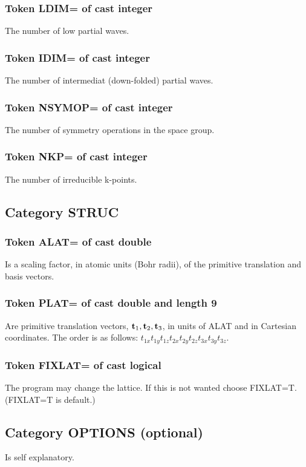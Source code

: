 \documentclass[aps,twocolumn,a4]{revtex4}
\begin{document}
\subsubsection{Token LDIM= of cast integer}
The number of low partial waves.

\subsubsection{Token IDIM= of cast integer}
The number of intermediat (down-folded) partial waves.

\subsubsection{Token NSYMOP= of cast integer}
The number of symmetry operations in the space group.

\subsubsection{Token NKP= of cast integer}
The number of irreducible k-points.

\subsection{Category STRUC}

\subsubsection{Token ALAT= of cast double}
Is a scaling factor, in atomic units (Bohr radii), of the primitive
translation and basis vectors.

\subsubsection{Token PLAT= of cast double and length 9}
Are primitive translation vectors, ${\bf t}_1, {\bf t}_2, {\bf t}_3$,
in units of ALAT and in Cartesian coordinates. The order is as follows:
$t_{1x} t_{1y} t_{1z} t_{2x} t_{2y} t_{2z} t_{3x} t_{3y} t_{3z}$.

\subsubsection{Token FIXLAT= of cast logical}
The program may change the lattice. If this is not wanted choose
FIXLAT=T. (FIXLAT=T is default.)

\subsection{Category OPTIONS (optional)}
Is self explanatory.
\end{document}
